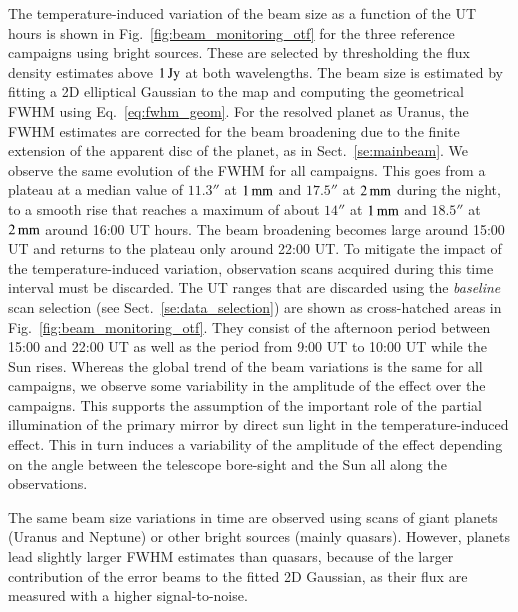 \documentclass[traditionalabstract]{aa}
\newcommand{\lp}[1]{#1}
\begin{document}
The temperature-induced variation of the beam size as a function of
the UT hours is shown in Fig.~\ref{fig:beam_monitoring_otf} for the
three reference campaigns using bright sources. These are
selected by thresholding the flux density estimates above $1\,\rm{Jy}$
at both wavelengths. The beam size is estimated by fitting a 2D
elliptical Gaussian to the map {\lp and computing the geometrical FWHM
using Eq.~\ref{eq:fwhm_geom}.} For the resolved planet as Uranus, the
FWHM estimates are corrected for the beam broadening due to the finite
extension of the apparent disc of the planet, as in
Sect.~\ref{se:mainbeam}.
We observe the same evolution of
the FWHM for all campaigns. 
This goes from a plateau at a median value of $11.3''$ at $1\,\rm{mm}$
and $17.5''$ at $2\,\rm{mm}$ during the night, to a smooth rise that
reaches a maximum of about $14''$ at $1\,\rm{mm}$ and $18.5''$ at
$2\,\rm{mm}$ around 16:00 UT hours. The beam broadening becomes large
around 15:00 UT and returns to the plateau only around 22:00 UT.
To mitigate the impact of the temperature-induced variation,
observation scans acquired during this time interval must be
discarded. The UT ranges that are discarded
using the \emph{baseline} scan selection (see
Sect.~\ref{se:data_selection}) are shown as cross-hatched areas in
Fig.~\ref{fig:beam_monitoring_otf}.
They consist of the afternoon
period between 15:00 and 22:00 UT as well as the period from 9:00 UT to 10:00 UT while the Sun
rises. 
{\lp Whereas the global trend of the beam variations is the
same for all campaigns, we observe some variability in the amplitude
of the effect over the campaigns. This supports the assumption of the
important role of the partial illumination of the primary mirror by
direct sun light in the temperature-induced effect. This in turn
induces a variability of the amplitude of the effect depending on the
angle between the telescope bore-sight %
and the Sun all along the
observations.}

The same beam size variations in time are observed using scans of giant planets
(Uranus and Neptune) or other bright
sources (mainly quasars). However, planets lead slightly larger FWHM
estimates than quasars, because of
the larger contribution of the error beams to the fitted 2D Gaussian,
as their flux are measured with a higher signal-to-noise.


%

\end{document}
